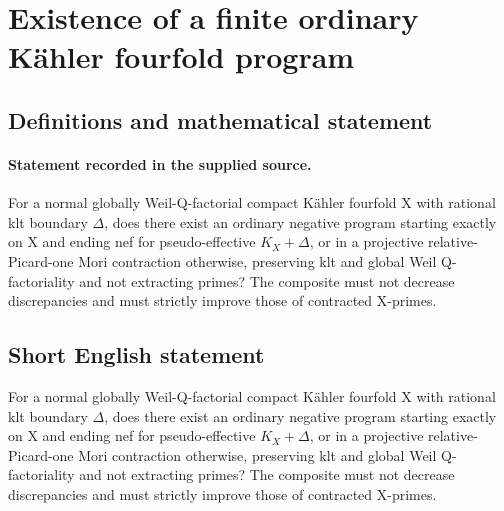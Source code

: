 \documentclass[11pt]{article}
\begin{document}
\section*{Existence of a finite ordinary Kähler fourfold program}\label{statement}
\subsection{Definitions and mathematical statement}
\paragraph{Statement recorded in the supplied source.}
For a normal globally Weil-Q-factorial compact Kähler fourfold X with rational klt boundary $\Delta $, does there exist an ordinary negative program starting exactly on X and ending nef for pseudo-effective $K_X+\Delta $, or in a projective relative-Picard-one Mori contraction otherwise, preserving klt and global Weil Q-factoriality and not extracting primes? The composite must not decrease discrepancies and must strictly improve those of contracted X-primes.
\subsection{Short English statement}
For a normal globally Weil-Q-factorial compact Kähler fourfold X with rational klt boundary $\Delta $, does there exist an ordinary negative program starting exactly on X and ending nef for pseudo-effective $K_X+\Delta $, or in a projective relative-Picard-one Mori contraction otherwise, preserving klt and global Weil Q-factoriality and not extracting primes? The composite must not decrease discrepancies and must strictly improve those of contracted X-primes.
\end{document}
